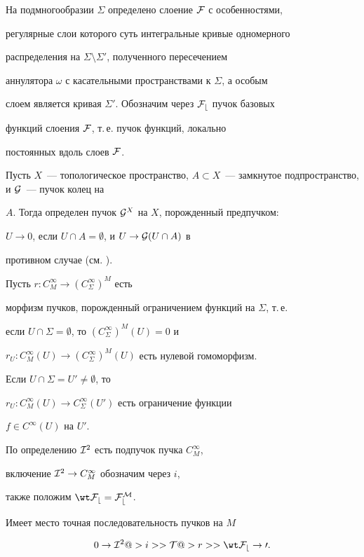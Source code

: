 На подмногообразии $\Sigma$ определено слоение $\cal F$ с особенностями,


регулярные слои которого суть интегральные кривые одномерного


распределения на $\Sigma \setminus \Sigma'$, полученного пересечением


аннулятора $\omega$ с касательными пространствами к $\Sigma$, а особым


слоем является кривая $\Sigma'$. Обозначим через $\cal F_b$ пучок базовых


функций слоения $\cal F$, т.\,е. пучок функций, локально


постоянных вдоль слоев $\cal F$.





Пусть $X$~--- топологическое пространство, $A \subset


X$~--- замкнутое подпространство, и $\cG$~--- пучок колец на


$A$. Тогда определен пучок ${\cal G}^X$ на $X$, порожденный предпучком:


$U \to {0}$, если $U \cap A = \emptyset$, и $U \to {\cal G}(U \cap A)$ в


противном случае (см. \cite{Bre}).








Пусть $r: C^\infty_M \to (C^\infty_\Sigma)^M$ есть


морфизм пучков, порожденный ограничением функций на $\Sigma$, т.\,е.


если $U \cap \Sigma = \emptyset$, то $(C^\infty_\Sigma)^M(U) = 0$ и


$r_U : C^\infty_M(U) \to (C^\infty_\Sigma)^M(U)$ есть нулевой гомоморфизм.


Если $U \cap \Sigma = U' \ne \emptyset$, то


$r_U : C^\infty_M(U) \to C^\infty_\Sigma(U')$ есть ограничение функции


$f \in C^\infty(U)$ на $U'$.


По определению ${\cal I}^2$ есть подпучок пучка $C^\infty_M$,


включение ${\cal I}^2 \to C^\infty_M$ обозначим через $i$,


также положим $\wt\cF_b = \cF_b^M$.





\begin{statnonum} \label{st1}


Имеет место точная последовательность пучков на $M$


\begin{equation} \label{eq9}


0 \to \cI^2 @>{i}>> \cT @>{r}>> \wt\cF_b \to 0.


\end{equation}


\end{statnonum}





